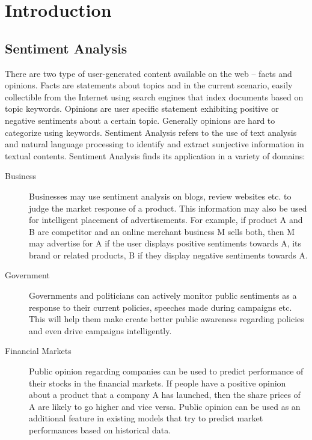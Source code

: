 \section{Introduction}

\subsection{Sentiment Analysis}
There are two type of user-generated content available on the web – facts and opinions.
Facts are statements about topics and in the current scenario, easily collectible from the Internet
	using search engines that index documents based on topic keywords.
Opinions are user specific statement exhibiting positive or negative sentiments about a certain topic.
Generally opinions are hard to categorize using keywords. %
Sentiment Analysis refers to the use of text analysis and natural language processing
	to identify and extract sunjective information in textual contents. %
Sentiment Analysis finds its application in a variety of domains:

\begin{description}
\item[Business]{
Businesses may use sentiment analysis on blogs, review websites etc. to judge the market response of a product. This information may also be used for intelligent placement of advertisements. For example, if product A and B are competitor and an online merchant business M sells both, then M may advertise for A if the user displays positive sentiments towards A, its brand or related products, B if they display negative sentiments towards A.
}
\item[Government]{
Governments and politicians can actively monitor public sentiments as a response to their current policies, speeches made during campaigns etc. This will help them make create better public awareness regarding policies and even drive campaigns intelligently.
}
\item[Financial Markets]{
Public opinion regarding companies can be used to predict performance of their stocks in the financial markets. If people have a positive opinion about a product that a company A has launched, then the share prices of A are likely to go higher and vice versa. Public opinion can be used as an additional feature in existing models that try to predict market performances based on historical data.
}
\end{description}

